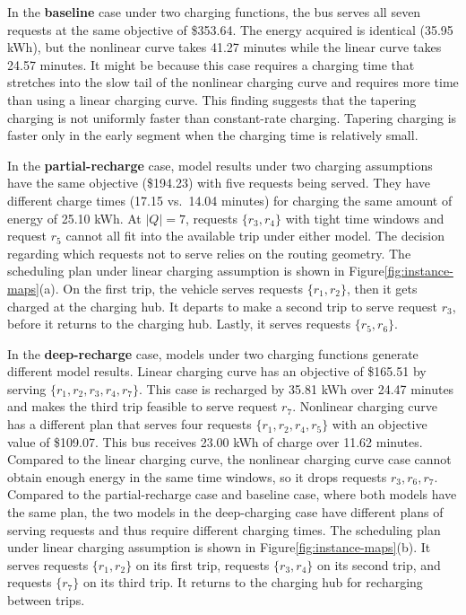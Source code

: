 \documentclass[11pt]{article}
\begin{document}
In the \textbf{baseline} case under two charging functions, the bus serves all seven requests at the same objective of \$353.64. The energy acquired is identical (35.95 kWh), but the nonlinear curve takes 41.27 minutes while the linear curve takes 24.57 minutes. It might be because this case requires a charging time that stretches into the slow tail of the nonlinear charging curve and requires more time than using a linear charging curve. This finding suggests that the tapering charging is not uniformly faster than constant-rate charging. Tapering charging is faster only in the early segment when the charging time is relatively small.

In the \textbf{partial-recharge} case, model results under two charging assumptions have the same objective (\$194.23) with five requests being served. They have different charge times (17.15 vs.\ 14.04 minutes) for charging the same amount of energy of 25.10 kWh. At \(|Q|=7\), requests \(\{r_3,r_4\}\) with tight time windows and request \(r_5\) cannot all fit into the available trip under either model. The decision regarding which requests not to serve relies on the routing geometry. The scheduling plan under linear charging assumption is shown in Figure\ref{fig:instance-maps}(a). On the first trip, the vehicle serves requests \(\{r_1, r_2\}\), then it gets charged at the charging hub. It departs to make a second trip to serve request \({r_3}\), before it returns to the charging hub. Lastly, it serves requests \(\{r_5, r_6\}\).

In the \textbf{deep-recharge} case, models under two charging functions generate different model results. Linear charging curve has an objective of \$165.51 by serving \(\{r_1,r_2,r_3,r_4,r_7\}\). This case is recharged by 35.81 kWh over 24.47 minutes and makes the third trip feasible to serve request \(r_7\). Nonlinear charging curve has a different plan that serves four requests \(\{r_1,r_2,r_4,r_5\}\) with an objective value of \$109.07. This bus receives 23.00 kWh of charge over 11.62 minutes. Compared to the linear charging curve, the nonlinear charging curve case cannot obtain enough energy in the same time windows, so it drops requests \(r_3,r_6,r_7\). Compared to the partial-recharge case and baseline case, where both models have the same plan, the two models in the deep-charging case have different plans of serving requests and thus require different charging times. The scheduling plan under linear charging assumption is shown in Figure\ref{fig:instance-maps}(b). It serves requests \(\{r_1, r_2\}\) on its first trip, requests \(\{r_3, r_4\}\) on its second trip, and requests \(\{r_7\}\) on its third trip. It returns to the charging hub for recharging between trips. 
\end{document}
